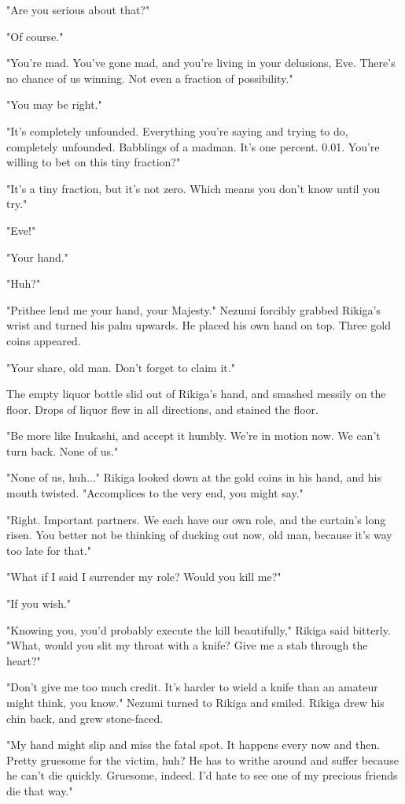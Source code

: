 "Are you serious about that?"

"Of course."

"You're mad. You've gone mad, and you're living in your delusions, Eve.
There's no chance of us winning. Not even a fraction of possibility."

"You may be right."

"It's completely unfounded. Everything you're saying and trying to do,
completely unfounded. Babblings of a madman. It's one percent. 0.01.
You're willing to bet on this tiny fraction?"

"It's a tiny fraction, but it's not zero. Which means you don't know
until you try."

"Eve!"

"Your hand."

"Huh?"

"Prithee lend me your hand, your Majesty." Nezumi forcibly grabbed
Rikiga's wrist and turned his palm upwards. He placed his own hand on
top. Three gold coins appeared.

"Your share, old man. Don't forget to claim it."

The empty liquor bottle slid out of Rikiga's hand, and smashed messily
on the floor. Drops of liquor flew in all directions, and stained the
floor.

"Be more like Inukashi, and accept it humbly. We're in motion now. We
can't turn back. None of us."

"None of us, huh..." Rikiga looked down at the gold coins in his hand,
and his mouth twisted. "Accomplices to the very end, you might say."

"Right. Important partners. We each have our own role, and the curtain's
long risen. You better not be thinking of ducking out now, old man,
because it's way too late for that."

"What if I said I surrender my role? Would you kill me?"

"If you wish."

"Knowing you, you'd probably execute the kill beautifully," Rikiga said
bitterly. "What, would you slit my throat with a knife? Give me a stab
through the heart?"

"Don't give me too much credit. It's harder to wield a knife than an
amateur might think, you know." Nezumi turned to Rikiga and smiled.
Rikiga drew his chin back, and grew stone-faced.

"My hand might slip and miss the fatal spot. It happens every now and
then. Pretty gruesome for the victim, huh? He has to writhe around and
suffer because he can't die quickly. Gruesome, indeed. I'd hate to see
one of my precious friends die that way."

